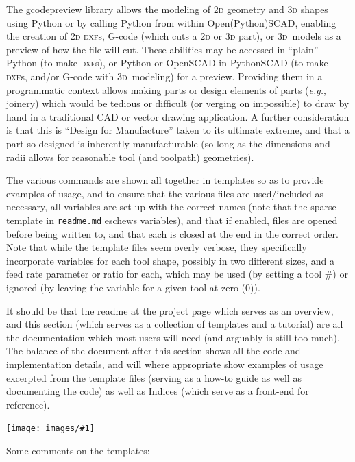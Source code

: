 \documentclass{ltxdoc}
\newcommand{\includeimage}[1]{\bigskip\noindent\texttt{[image: images/\#1]}\bigskip}
\begin{document}
The gcodepreview library allows the modeling of \textsc{2d} geometry and \textsc{3d} shapes using Python or by calling Python from within Open(Python)SCAD, enabling the creation of \textsc{2d} \textsc{dxf}s, G-code (which cuts a \textsc{2d} or \textsc{3d} part), or \textsc{3d}~models as a preview of how the file will cut. These abilities may be accessed in ``plain'' Python (to make \textsc{dxf}s), or Python or OpenSCAD in PythonSCAD (to make \textsc{dxf}s, and/or G-code with \textsc{3d}~modeling) for a preview. Providing them in a programmatic context allows making parts or design elements of parts (\emph{e.g.}, joinery) which would be tedious or difficult (or verging on impossible) to draw by hand in a traditional CAD or vector drawing application. A further consideration is that this is ``Design for Manufacture'' taken to its ultimate extreme, and that a part so designed is inherently manufacturable (so long as the dimensions and radii allows for reasonable tool (and toolpath) geometries).

The various commands are shown all together in templates so as to provide examples of usage, and to ensure that the various files are used/included as necessary, all variables are set up with the correct names (note that the sparse template in \verb|readme.md| eschews variables), and that if enabled, files are opened before being written to, and that each is closed at the end in the correct order. Note that while the template files seem overly verbose, they specifically incorporate variables for each tool shape, possibly in two different sizes, and a feed rate parameter or ratio for each, which may be used (by setting a tool \#) or ignored (by leaving the variable for a given tool at zero (0)). 

It should be that the readme at the project page which serves as an overview, and this section (which serves as a collection of templates and a tutorial) are all the documentation which most users will need (and arguably is still too much). The balance of the document after this section shows all the code and implementation details, and will where appropriate show examples of usage excerpted from the template files (serving as a how-to guide as well as documenting the code) as well as Indices (which serve as a front-end for reference).

\includeimage{panorama.pdf}

Some comments on the templates:
\end{document}
